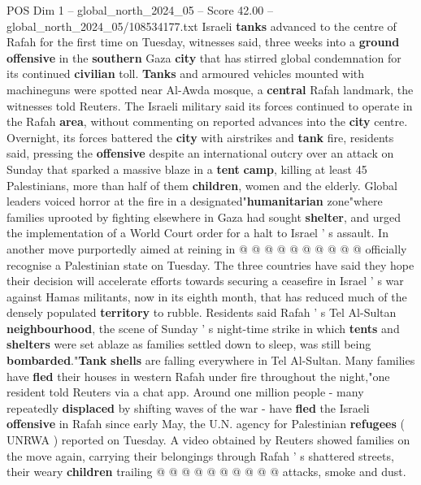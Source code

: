 \begin{textsample}{POS Dim 1 – global\_north\_2024\_05 – Score 42.00 – global\_north\_2024\_05/108534177.txt}  \label{ex:f1_pos_277}
Israeli \textbf{tanks} advanced to the centre of Rafah for the first time on Tuesday, witnesses said, three weeks into a \textbf{ground} \textbf{offensive} in the \textbf{southern} Gaza \textbf{city} that has stirred global condemnation for its continued \textbf{civilian} toll. \textbf{Tanks} and armoured vehicles mounted with machineguns were spotted near Al-Awda mosque, a \textbf{central} Rafah landmark, the witnesses told Reuters.
The Israeli military said its forces continued to operate in the Rafah \textbf{area}, without commenting on reported advances into the \textbf{city} centre.
Overnight, its forces battered the \textbf{city} with airstrikes and \textbf{tank} fire, residents said, pressing the \textbf{offensive} despite an international outcry over an attack on Sunday that sparked a massive blaze in a \textbf{tent} \textbf{camp}, killing at least 45 Palestinians, more than half of them \textbf{children}, women and the elderly.
Global leaders voiced horror at the fire in a designated"\textbf{humanitarian} zone"where families uprooted by fighting elsewhere in Gaza had sought \textbf{shelter}, and urged the implementation of a World Court order for a halt to Israel ' s assault.
In another move purportedly aimed at reining in @ @ @ @ @ @ @ @ @ @ officially recognise a Palestinian state on Tuesday.
The three countries have said they hope their decision will accelerate efforts towards securing a ceasefire in Israel ' s war against Hamas militants, now in its eighth month, that has reduced much of the densely populated \textbf{territory} to rubble.
Residents said Rafah ' s Tel Al-Sultan \textbf{neighbourhood}, the scene of Sunday ' s night-time strike in which \textbf{tents} and \textbf{shelters} were set ablaze as families settled down to sleep, was still being \textbf{bombarded}."\textbf{Tank} \textbf{shells} are falling everywhere in Tel Al-Sultan.
Many families have \textbf{fled} their houses in western Rafah under fire throughout the night,"one resident told Reuters via a chat app.
Around one million people - many repeatedly \textbf{displaced} by shifting waves of the war - have \textbf{fled} the Israeli \textbf{offensive} in Rafah since early May, the U.N. agency for Palestinian \textbf{refugees} ( UNRWA ) reported on Tuesday.
A video obtained by Reuters showed families on the move again, carrying their belongings through Rafah ' s shattered streets, their weary \textbf{children} trailing @ @ @ @ @ @ @ @ @ @ attacks, smoke and dust.

\end{textsample}
